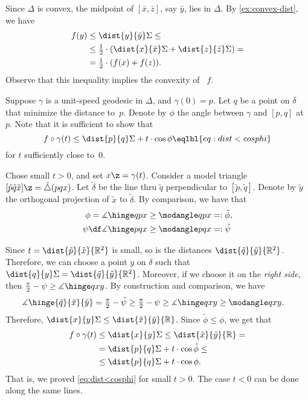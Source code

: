 Since $\Delta$ is convex, the midpoint of $[\bar x,\bar z]$, say $\bar y$, lies in $\Delta$.
By \ref{ex:convex-dist}, we have 
\begin{align*}
f(y)&\le \dist{y}{\bar y}\Sigma
\le
\\
&\le
\tfrac12\cdot(\dist{x}{\bar x}\Sigma
+
\dist{z}{\bar z}\Sigma)
=
\\
&=
\tfrac12\cdot(f(x)+f(z)).
\end{align*}
Observe that this inequality implies the convexity of ~$f$.

Suppose $\gamma$ is a unit-speed geodesic in $\Delta$, and $\gamma(0)=p$. 
Let $q$ be a point on $\delta$ that minimize the distance to~$p$.
Denote by $\phi$ the angle between $\gamma$ and $[p,q]$ at~$p$.
Note that it is sufficient to show that 
\[f\circ\gamma(t)\le 
\dist{p}{q}\Sigma+t\cdot\cos\phi\eqlbl{eq:dist<cosphi}\]
for $t$ sufficiently close to~$0$.

Chose small $t>0$, and set $x\z=\gamma(t)$.
Consider a model triangle $[\tilde p\tilde q\tilde x]\z=\tilde\triangle(pqx)$.
Let $\tilde\delta$ be the line thru $\tilde q$ perpendicular to $[\tilde p,\tilde q]$.
Denote by $\tilde y$ the orthogonal projection of $\tilde x$ to $\tilde\delta$.
By comparison, we have that 
\begin{align*}
\phi
=\measuredangle\hinge qpx
&\ge \modangle qpx
\mathrel{=:}\tilde\phi,
\\
\psi\df
\measuredangle\hinge pqx
&\ge 
\modangle pqx
\mathrel{=:}\tilde \psi
\end{align*}

Since $t=\dist{\tilde p}{\tilde x}{\mathbb{R}^2}$ is small, so is the distances $\dist{\tilde q}{\tilde y}{\mathbb{R}^2}$.
Therefore, we can choose a point $y$ on $\delta$ such that $\dist{q}{y}\Sigma=\dist{\tilde q}{\tilde y}{\mathbb{R}^2}$.
Moreover, if we choose it on the {}\emph{right side}, then $\tfrac\pi2-\psi \ge \measuredangle\hinge qxy$.
By construction and comparison, we have 
\begin{align*}
\measuredangle\hinge {\tilde q}{\tilde x}{\tilde y}&=\tfrac\pi2-\tilde\psi
\ge
\tfrac\pi2-\psi
\ge
\measuredangle\hinge q x y
\ge 
\modangle q x y.
\end{align*}
Therefore, $\dist{x}{y}\Sigma\le \dist{\tilde x}{\tilde y}{\mathbb{R}}$.
Since $\tilde\phi\le\phi$, we get that
\begin{align*}
f\circ\gamma(t)&\le \dist{x}{y}\Sigma\le 
\dist{\tilde x}{\tilde y}{\mathbb{R}}=
\\
&=
\dist{p}{q}\Sigma+t\cdot\cos\tilde\phi
\le
\\
&\le
\dist{p}{q}\Sigma+t\cdot\cos\phi.
\end{align*}
That is, we proved \ref{eq:dist<cosphi} for small $t>0$.
The case $t<0$ can be done along the same lines. 

